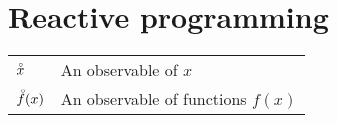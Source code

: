 \section*{Reactive programming}
\begin{table}[H]
    \raggedright
    \begin{tabularx}{\textwidth}{l X}
        $\accentset{\circ}{x}$                  & An observable of $x$ \\
        $\accentset{\circ}{f}(x)$               & An observable of functions $f(x)$ \\
    \end{tabularx}
    \label{tab:notation_reactiveprogramming}
\end{table}
